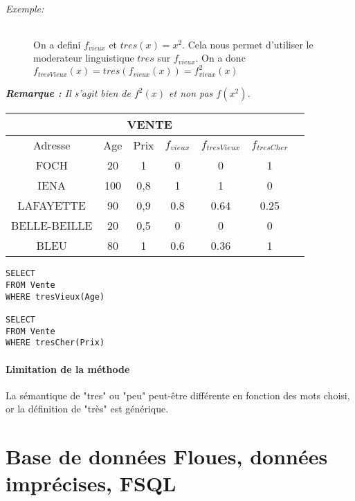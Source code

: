 \documentclass[a4paper,11pt]{article}
\begin{document}
\paragraph{Exemple:}
\begin{center}
		\begin{figure}[!h]
			\centering
			
			\caption{}{On a defini  $f_{vieux}$ et $tres(x)=x^2$. Cela nous permet d'utiliser le moderateur linguistique $ tres$ sur $f_{vieux}$. On a donc $f_{tresVieux}(x)=tres(f_{vieux}(x))=f_{vieux}^2(x)$}
		\end{figure}				
\end{center}
\emph{\textbf{Remarque : }Il s'agit bien de $f^2(x)$ et non pas $f(x^2)$.}
\begin{center}
\begin{tabular}{|c|c|c|c|c|c|c|}
	\hline
	\multicolumn{6}{|c|}{\textbf{VENTE}} \\
	\hline
	\hline 
	Adresse & Age & Prix & $f_{vieux}$ & $f_{tresVieux}$ & $f_{tresCher}$ \\ 
	\hline 
	\hline
	FOCH & 20 & 1 & 0 & 0 & 1\\ 
	\hline 
	IENA & 100 & 0,8 & 1 & 1 & 0\\ 
	\hline 
	LAFAYETTE & 90 & 0,9 & 0.8 & 0.64 & 0.25\\ 
	\hline 
	BELLE-BEILLE & 20 & 0,5 & 0 & 0 & 0\\ 
	\hline 
	BLEU & 80 & 1 & 0.6 & 0.36 & 1\\ 
	\hline 
\end{tabular} 
\end{center}
\begin{lstlisting}[mathescape]
SELECT
FROM Vente
WHERE tresVieux(Age)

SELECT
FROM Vente
WHERE tresCher(Prix)

\end{lstlisting}

\subsection{Limitation de la méthode}
La sémantique de "tres" ou "peu" peut-être différente en fonction des mots choisi, or la définition de "très" est générique.

\part{Base de données Floues, données imprécises, FSQL}
\end{document}
